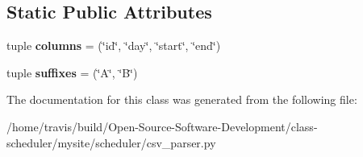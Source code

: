 \subsection*{Static Public Attributes}
\begin{DoxyCompactItemize}
\item 
\hypertarget{classscheduler_1_1csv__parser_1_1_block_parser_ac276431a1f6649ead463ce5bbfc998eb}{tuple {\bfseries columns} = (\char`\"{}id\char`\"{}, \char`\"{}day\char`\"{}, \char`\"{}start\char`\"{}, \char`\"{}end\char`\"{})}\label{classscheduler_1_1csv__parser_1_1_block_parser_ac276431a1f6649ead463ce5bbfc998eb}

\item 
\hypertarget{classscheduler_1_1csv__parser_1_1_block_parser_a1079ac8a21cbc2d30fa675f0e4d79097}{tuple {\bfseries suffixes} = (\char`\"{}A\char`\"{}, \char`\"{}B\char`\"{})}\label{classscheduler_1_1csv__parser_1_1_block_parser_a1079ac8a21cbc2d30fa675f0e4d79097}

\end{DoxyCompactItemize}


The documentation for this class was generated from the following file\-:\begin{DoxyCompactItemize}
\item 
/home/travis/build/\-Open-\/\-Source-\/\-Software-\/\-Development/class-\/scheduler/mysite/scheduler/csv\-\_\-parser.\-py\end{DoxyCompactItemize}
